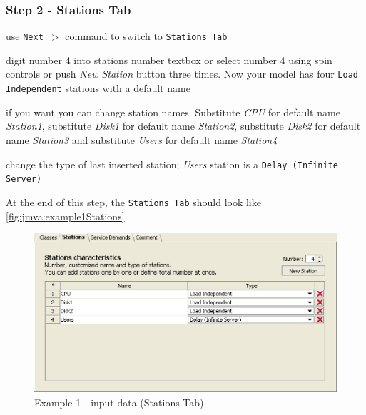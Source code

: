 \subsubsection{Step 2 - Stations Tab}
\begin{itemize*}
\item use \texttt{Next $>$} command to switch to \texttt{Stations Tab}
\item digit number 4 into stations number textbox or select number
4 using spin controls or push \emph{New Station} button three times.
Now your model has four \texttt{Load Independent} stations with a
default name
\item if you want you can change station names. Substitute \emph{CPU} for
default name \emph{Station1}, substitute \emph{Disk1} for default
name \emph{Station2}, substitute \emph{Disk2} for default name
\emph{Station3} and substitute \emph{Users} for default name
\emph{Station4}
\item change the type of last inserted station; \emph{Users} station is a
\texttt{Delay (Infinite Server)}
\end{itemize*}

At the end of this step, the \texttt{Stations Tab} should look like
\autoref{fig:jmva:example1Stations}.

\begin{figure}[htbp]
    \begin{center}
        \includegraphics[scale=.5]{img/jmva/example1Stations}
    \end{center}
    \caption{Example 1 - input data (Stations Tab)}
    \label{fig:jmva:example1Stations}
\end{figure}

